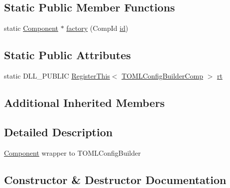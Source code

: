 \subsection*{Static Public Member Functions}
\begin{DoxyCompactItemize}
\item 
static \hyperlink{classtheoria_1_1core_1_1Component}{Component} $\ast$ \hyperlink{classtheoria_1_1core_1_1TOMLConfigBuilderComp_abb82664199a9549fddb64bc442a5ddfa}{factory} (Comp\+Id \hyperlink{classtheoria_1_1core_1_1Component_ab539df9f996efceda7743fa1b69cd25d}{id})
\end{DoxyCompactItemize}
\subsection*{Static Public Attributes}
\begin{DoxyCompactItemize}
\item 
static D\+L\+L\+\_\+\+P\+U\+B\+L\+IC \hyperlink{classtheoria_1_1core_1_1RegisterThis}{Register\+This}$<$ \hyperlink{classtheoria_1_1core_1_1TOMLConfigBuilderComp}{T\+O\+M\+L\+Config\+Builder\+Comp} $>$ \hyperlink{classtheoria_1_1core_1_1TOMLConfigBuilderComp_abba84fd2e773b9ab26692c9638a1dcc4}{rt}
\end{DoxyCompactItemize}
\subsection*{Additional Inherited Members}


\subsection{Detailed Description}
\hyperlink{classtheoria_1_1core_1_1Component}{Component} wrapper to T\+O\+M\+L\+Config\+Builder 

\subsection{Constructor \& Destructor Documentation}
\mbox{\label{classtheoria_1_1core_1_1TOMLConfigBuilderComp_a7944116685d64329a987f6dd3f0f8f17}} 
